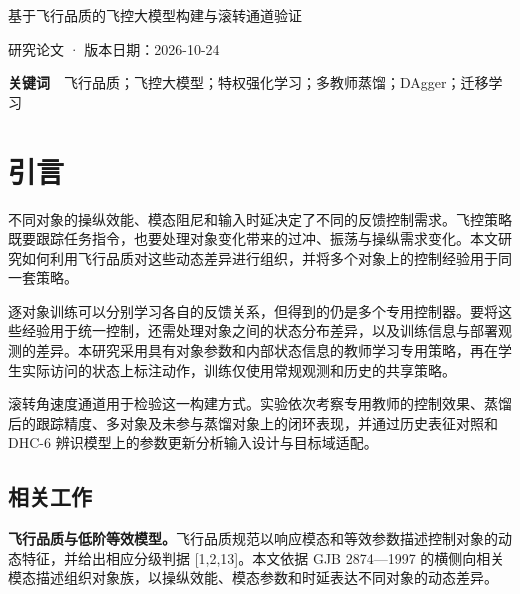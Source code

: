 \documentclass[UTF8,a4paper,11pt,fontset=fandol,scheme=plain]{ctexart}
\begin{document}
{\centering\LARGE\heiti 基于飞行品质的飞控大模型构建与滚转通道验证\par}
\vspace{6pt}
{\centering\small 研究论文 · 版本日期：2026-10-24\par}
\vspace{8pt}
\begin{abstract}\noindent \textbf{摘要　}将飞行品质的统一动态描述转化为可跨对象复用的控制知识，是飞控大模型的关键任务。本文提出基于飞行品质的飞控大模型构建路线，并以滚转通道开展验证。通过飞行品质相关参数构造 5,000 个对象，从中选取 50 个训练特权 PPO 教师，再经多轮 DAgger 将逐对象控制经验汇聚为统一策略。蒸馏得到的 tiny 学生含 3,856 个参数，在 44 个蒸馏源对象上相对教师的跟踪 RMSE 中位比为 1.28。面向 500 个分布外对象的 \ensuremath{\pm}1 deg/s 阶跃测试，统一学生通过率为 86.8\%，体现了统一策略的跨对象复用能力。目标域采用 75,040 参数的 small 学生，在 DHC-6 辨识模型上经 40 次参数更新，适配状态的 RMSE 中位数由 2.91 降至 0.59 deg/s，留出状态由 2.66 降至 2.15 deg/s。上述结果形成了从品质对象族、专用教师到统一控制策略及目标域适配的滚转通道验证链。\end{abstract}
\noindent \textbf{关键词}　飞行品质；飞控大模型；特权强化学习；多教师蒸馏；DAgger；迁移学习
\vspace{10pt}
\FloatBarrier
\section{引言}
\hypertarget{s1}{}\label{s1}
不同对象的操纵效能、模态阻尼和输入时延决定了不同的反馈控制需求。飞控策略既要跟踪任务指令，也要处理对象变化带来的过冲、振荡与操纵需求变化。本文研究如何利用飞行品质对这些动态差异进行组织，并将多个对象上的控制经验用于同一套策略。

逐对象训练可以分别学习各自的反馈关系，但得到的仍是多个专用控制器。要将这些经验用于统一控制，还需处理对象之间的状态分布差异，以及训练信息与部署观测的差异。本研究采用具有对象参数和内部状态信息的教师学习专用策略，再在学生实际访问的状态上标注动作，训练仅使用常规观测和历史的共享策略。

滚转角速度通道用于检验这一构建方式。实验依次考察专用教师的控制效果、蒸馏后的跟踪精度、多对象及未参与蒸馏对象上的闭环表现，并通过历史表征对照和 DHC-6 辨识模型上的参数更新分析输入设计与目标域适配。

\subsection{相关工作}
\hypertarget{s11}{}\label{s11}
\textbf{飞行品质与低阶等效模型。}飞行品质规范以响应模态和等效参数描述控制对象的动态特征，并给出相应分级判据 [1,2,13]。本文依据 GJB 2874—1997 的横侧向相关模态描述组织对象族，以操纵效能、模态参数和时延表达不同对象的动态差异。
\end{document}
